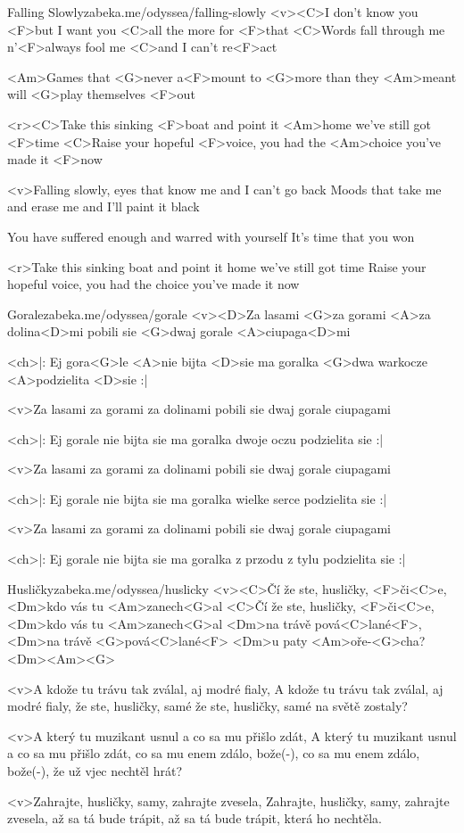 \begin{song}{26}{Falling Slowly}{zabeka.me/odyssea/falling-slowly}
	<v><C>I don't know you <F>but I want you
	<C>all the more for <F>that
	<C>Words fall through me n'<F>always fool me
	<C>and I can't re<F>act

	<Am>Games that <G>never a<F>mount
	to <G>more than they <Am>meant
	will <G>play themselves <F>out

	<r><C>Take this sinking <F>boat and point it <Am>home
	we've still got <F>time
	<C>Raise your hopeful <F>voice, you had the <Am>choice
	you've made it <F>now

	<v>Falling slowly, eyes that know me
	and I can't go back
	Moods that take me and erase me
	and I'll paint it black

	You have suffered enough
	and warred with yourself
	It's time that you won

	<r>Take this sinking boat and point it home
	we've still got time
	Raise your hopeful voice, you had the choice
	you've made it now

\end{song}
\begin{song}[Čechomor]{27}{Gorale}{zabeka.me/odyssea/gorale}
	<v><D>Za lasami <G>za gorami <A>za dolina<D>mi
	pobili sie <G>dwaj gorale <A>ciupaga<D>mi

	<ch>|: Ej gora<G>le <A>nie bijta <D>sie
	ma goralka <G>dwa warkocze
	<A>podzielita <D>sie :|

	<v>Za lasami za gorami za dolinami
	pobili sie dwaj gorale ciupagami

	<ch>|: Ej gorale nie bijta sie
	ma goralka dwoje oczu
	podzielita sie :|

	<v>Za lasami za gorami za dolinami
	pobili sie dwaj gorale ciupagami

	<ch>|: Ej gorale nie bijta sie
	ma goralka wielke serce
	podzielita sie :|

	<v>Za lasami za gorami za dolinami
	pobili sie dwaj gorale ciupagami

	<ch>|: Ej gorale nie bijta sie
	ma goralka z przodu z tylu
	podzielita sie :|

\end{song}
\begin{song}{28}{Husličky}{zabeka.me/odyssea/huslicky}
	<v><C>Čí že ste, husličky, <F>či<C>e,
	<Dm>kdo vás tu <Am>zanech<G>al
	<C>Čí že ste, husličky, <F>či<C>e,
	<Dm>kdo vás tu <Am>zanech<G>al
	<Dm>na trávě pová<C>lané<F>,
	<Dm>na trávě <G>pová<C>lané<F>
	<Dm>u paty <Am>oře-<G>cha?<Dm><Am><G>

	<v>A kdože tu trávu tak zválal, aj modré fialy,
	A kdože tu trávu tak zválal, aj modré fialy,
	že ste, husličky, samé
	že ste, husličky, samé na světě zostaly?

	<v>A který tu muzikant usnul a co sa mu přišlo zdát,
	A který tu muzikant usnul a co sa mu přišlo zdát,
	co sa mu enem zdálo, bože(-),
	co sa mu enem zdálo, bože(-), že už vjec nechtěl hrát?

	<v>Zahrajte, husličky, samy, zahrajte zvesela,
	Zahrajte, husličky, samy, zahrajte zvesela,
	až sa tá bude trápit,
	až sa tá bude trápit, která ho nechtěla.
\end{song}
